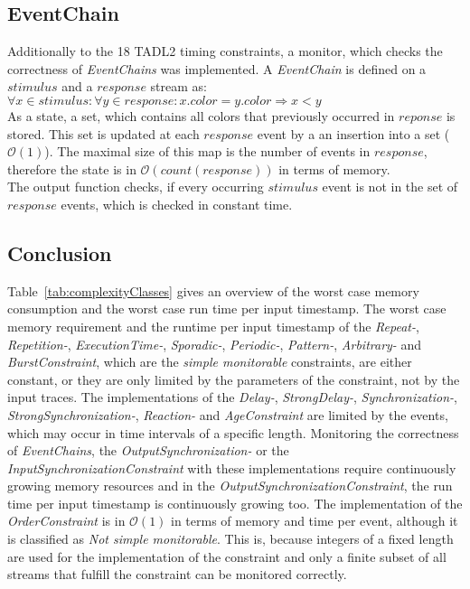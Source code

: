 \subsection{EventChain}
	Additionally to the 18 TADL2 timing constraints, a monitor, which checks the correctness of \textit{EventChains} was implemented. A \textit{EventChain} is defined on a $stimulus$ and a $response$ stream as:\\[10pt]
	$\forall x \in stimulus:\forall y\in response: x.color=y.color\Rightarrow x<y$\\[10pt]
	As a state, a set, which contains all colors that previously occurred in $reponse$ is stored. This set is updated at each $response$  event by a an insertion into a set ($\mathcal{O}(1)$). The maximal size of this map is the number of events in $response$, therefore the state is in $\mathcal{O}(count(response))$ in terms of memory.\\
	The output function checks, if every occurring $stimulus$ event is not in the set of $response$ events, which is checked in constant time.
	
\subsection{Conclusion}
Table~\ref{tab:complexityClasses} gives an overview of the worst case memory consumption and the worst case run time per input timestamp. The worst case memory requirement and the runtime per input timestamp of the \textit{Repeat-}, \textit{Repetition-}, \textit{ExecutionTime-}, \textit{Sporadic-}, \textit{Periodic-}, \textit{Pattern-}, \textit{Arbitrary-} and \textit{BurstConstraint}, which are the \textit{simple monitorable} constraints, are either constant, or they are only limited by the parameters of the constraint, not by the input traces. The implementations of the \textit{Delay-}, \textit{StrongDelay-}, \textit{Synchronization-}, \textit{StrongSynchronization-}, \textit{Reaction-} and \textit{AgeConstraint} are limited by the events, which may occur in time intervals of a specific length. Monitoring the correctness of \textit{EventChains}, the \textit{OutputSynchronization-} or the \textit{InputSynchronizationConstraint} with these implementations require continuously growing memory resources and in the \textit{OutputSynchronizationConstraint}, the run time per input timestamp is continuously growing too. The implementation of the \textit{OrderConstraint} is in $\mathcal{O}(1)$ in terms of memory and time per event, although it is classified as \textit{Not simple monitorable}. This is, because integers of a fixed length are used for the implementation of the constraint and only a finite subset of all streams that fulfill the constraint can be monitored correctly.

